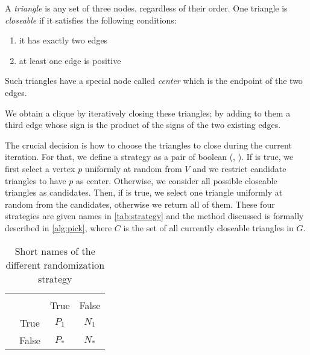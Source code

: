 A \emph{triangle} is any set of three nodes, regardless of their order. One
triangle is \emph{closeable} if it satisfies the following conditions:
\begin{enumerate}[i]
	\item it has exactly two edges
	\item at least one edge is positive
\end{enumerate}
Such triangles have a special node called \emph{center} which is the endpoint
of the two edges.
\begin{center}
\end{center}

We obtain a clique by iteratively closing these triangles; by adding to them a
third edge whose sign is the product of the signs of the two existing edges.

The crucial decision is how to choose the triangles to close during the
current iteration. For that, we define a strategy as a pair of boolean
(\pvt{}, \oaat{}). If \pvt{} is true, we first select a vertex $p$ uniformly
at random from $V$ and we restrict candidate triangles to have $p$ as center.
Otherwise, we consider all possible closeable triangles as candidates.  Then,
if \oaat{} is true, we select one triangle uniformly at random from the
candidates, otherwise we return all of them. These four strategies are given
names in \autoref{tab:strategy} and the method discussed is formally described
in \autoref{alg:pick}, where $C$ is the set of all currently closeable
triangles in $G$.

\begin{table}[htpb]
	\centering
	\caption{Short names of the different randomization strategy
		\label{tab:strategy}}
	\begin{tabular}{lccc}
		\toprule
		& & \multicolumn{2}{c}{\pvt{}} \\
		    &          & True & False \\
		\midrule
		\multirow{2}{*}{\oaat{}} & True   & $P_1$ & $N_1$ \\
		& False & $P_*$ & $N_*$ \\
		\bottomrule
	\end{tabular}
\end{table}

